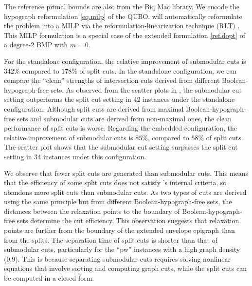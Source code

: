 The reference primal bounds are also from the Biq Mac library. We encode the hypograph reformulation \eqref{eq.milp} of the QUBO. \scip will automatically reformulate the problem into a MILP via the reformulation-linearization technique  (RLT) \cite{adams1986tight}. This MILP formulation is a special case of the extended formulation \eqref{ref.dopt} of a degree-2 BMP with $m = 0$.
 
 
For the standalone  configuration, the relative improvement of submodular cuts is $342\%$  compared to $178\%$  of split cuts. In the standalone configuration, we can compare the ``clean'' strengths of intersection cuts derived from different Boolean-hypograph-free sets. As observed from the scatter plots in  , the submodular cut setting outperforms the split cut setting in 42 instances under the standalone configuration.  Although split cuts are derived from maximal Boolean-hypograph-free sets and submodular cuts are derived from non-maximal ones, the clean performance of  split cuts is worse.  Regarding the embedded configuration,  the relative improvement of submodular cuts is $85\%$,  compared to $58\%$   of split cuts. The scatter plot shows that the submodular cut setting surpasses the split cut setting in 34 instances under this configuration.
 
We observe that fewer split cuts are generated than submodular cuts. This means that the efficiency of some split cuts does not satisfy \scip's internal criteria, so \scip abandons more split cuts  than submodular cuts.  As two types of cuts are derived using the same principle but from different Boolean-hypograph-free sets,  the distances between the relaxation points to the boundary of Boolean-hypograph-free sets determine the cut efficiency. This observation suggests that relaxation points are further from the boundary of the extended envelope epigraph than from the splits. The separation time of split cuts is shorter than that of submodular cuts, particularly for the ``pw'' instances with a high graph density (0.9). This is because separating submodular cuts requires solving  nonlinear equations that involve sorting and computing graph cuts, while the split cuts can be computed  in a closed form.

\begin{table} [htbp]
\centering
{}
\caption{Summary of \maxcut results}\label{alpha}
\end{table}

